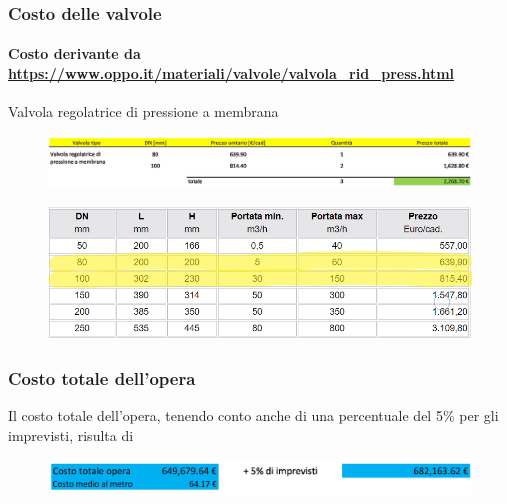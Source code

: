 \documentclass{beamer}
\begin{document}
\begin{frame}
	\frametitle{Costo delle valvole}
	\framesubtitle{Costo derivante da \url{https://www.oppo.it/materiali/valvole/valvola_rid_press.html}}
	Valvola regolatrice di pressione a membrana
	\begin{figure}
	 \centering
	 \includegraphics[width=\textwidth]{images/costo_valvole}
	\end{figure}
%
	\begin{figure}
	 \centering
	 \includegraphics[width=.5\textwidth]{images/valves_oppo}
	\end{figure}
\end{frame}
%
\begin{frame}
	\frametitle{Costo totale dell'opera}
	Il costo totale dell’opera, tenendo conto anche di una percentuale del 5\% per gli imprevisti, risulta di
	\begin{figure}
	 \centering
	 \includegraphics[width=\textwidth]{images/costo_totale}
	\end{figure}
\end{frame}
%
\end{document}
